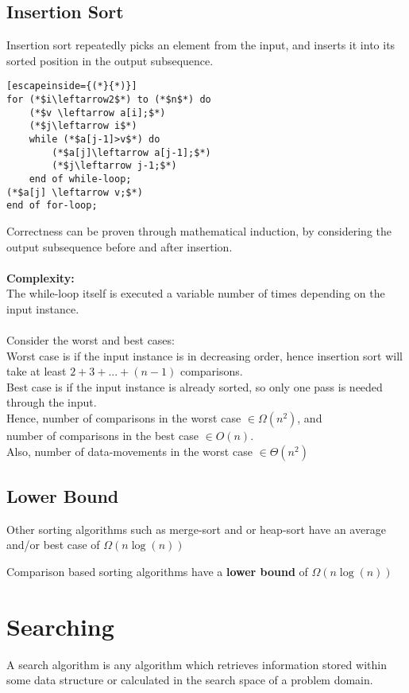 \documentclass[a4paper]{article}
\begin{document}
\subsection{Insertion Sort}
Insertion sort repeatedly picks an element from the input, and inserts it into its sorted position in the output subsequence.
\begin{lstlisting}[escapeinside={(*}{*)}]
for (*$i\leftarrow2$*) to (*$n$*) do
	(*$v \leftarrow a[i];$*)
	(*$j\leftarrow i$*)
	while (*$a[j-1]>v$*) do
		(*$a[j]\leftarrow a[j-1];$*)
		(*$j\leftarrow j-1;$*)
	end of while-loop;
(*$a[j] \leftarrow v;$*)
end of for-loop;
\end{lstlisting}

Correctness can be proven through mathematical induction, by considering the output subsequence before and after insertion.\\ \\
\textbf{Complexity:}\\
The while-loop itself is executed a variable number of times depending on the input instance.\\ \\
Consider the worst and best cases:\\
Worst case is if the input instance is in decreasing order, hence insertion sort will take at least $2 + 3 +...+ (n-1)$ comparisons.\\
Best case is if the input instance is already sorted, so only one pass is needed through the input.\\
Hence,
number of comparisons in the worst case $\in \Omega(n^2)$, and\\
number of comparisons in the best case $\in O(n)$.\\
Also,
number of data-movements in the worst case $\in \Theta(n^2)$

\subsection{Lower Bound}
Other sorting algorithms such as merge-sort and or heap-sort have an average and/or best case of $\Omega(n \log(n))$

Comparison based sorting algorithms have a \textbf{lower bound} of $\Omega(n \log(n))$

\section{Searching}
A search algorithm is any algorithm which retrieves information stored within some data structure or calculated in the search space of a problem domain.
\end{document}
